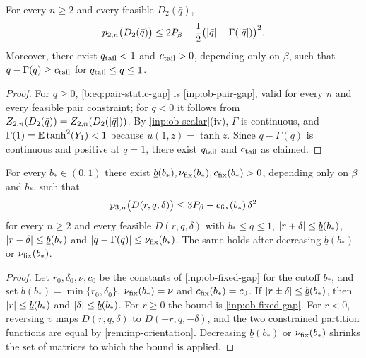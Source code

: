 \begin{lemma}\label{lem:st-pair}
For every $n\ge2$ and every feasible $D_2(\bar q)$,
\begin{equation}\label{b:eq:pair-static-gap}
 p_{2,n}\bigl(D_2(\bar q)\bigr)\le2P_\beta-\frac12\bigl(\lvert \bar q\rvert-\Gamma(\lvert \bar q\rvert)\bigr)^2.
\end{equation}
Moreover, there exist $q_{\rm tail}<1$ and $c_{\rm tail}>0$, depending only on $\beta$, such that $q-\Gamma(q)\ge c_{\rm tail}$ for $q_{\rm tail}\le q\le1$.
\end{lemma}

\begin{proof}
For $\bar q\ge0$, \eqref{b:eq:pair-static-gap} is \cref{inp:ob-pair-gap}, valid for every $n$ and every feasible pair constraint; for $\bar q<0$ it follows from $Z_{2,n}(D_2(\bar q))=Z_{2,n}(D_2(\lvert \bar q\rvert))$. By \cref{inp:ob-scalar}(iv), $\Gamma$ is continuous, and $\Gamma(1)=\mathbb E\tanh^2(Y_1)<1$ because $u(1,z)=\tanh z$. Since $q-\Gamma(q)$ is continuous and positive at $q=1$, there exist $q_{\rm tail}$ and $c_{\rm tail}$ as claimed.
\end{proof}

\begin{lemma}\label{lem:st-fixed}
For every $b_*\in(0,1)$ there exist $\underline b(b_*),\nu_{\rm fix}(b_*),c_{\rm fix}(b_*)>0$, depending only on $\beta$ and $b_*$, such that
\begin{equation}\label{b:eq:fixed-pressure-gap}
 p_{3,n}\bigl(D(r,q,\delta)\bigr)\le3P_\beta-c_{\rm fix}(b_*)\,\delta^2
\end{equation}
for every $n\ge2$ and every feasible $D(r,q,\delta)$ with $b_*\le q\le1$, $\lvert r+\delta\rvert\le\underline b(b_*)$, $\lvert r-\delta\rvert\le\underline b(b_*)$ and $\lvert q-\Gamma(q)\rvert\le\nu_{\rm fix}(b_*)$. The same holds after decreasing $\underline b(b_*)$ or $\nu_{\rm fix}(b_*)$.
\end{lemma}

\begin{proof}
Let $r_0,\delta_0,\nu,c_0$ be the constants of \cref{inp:ob-fixed-gap} for the cutoff $b_*$, and set $\underline b(b_*)=\min\{r_0,\delta_0\}$, $\nu_{\rm fix}(b_*)=\nu$ and $c_{\rm fix}(b_*)=c_0$. If $\lvert r\pm\delta\rvert\le\underline b(b_*)$, then $\lvert r\rvert\le\underline b(b_*)$ and $\lvert \delta\rvert\le\underline b(b_*)$. For $r\ge0$ the bound is \cref{inp:ob-fixed-gap}. For $r<0$, reversing $v$ maps $D(r,q,\delta)$ to $D(-r,q,-\delta)$, and the two constrained partition functions are equal by \cref{rem:inp-orientation}. Decreasing $\underline b(b_*)$ or $\nu_{\rm fix}(b_*)$ shrinks the set of matrices to which the bound is applied.
\end{proof}

